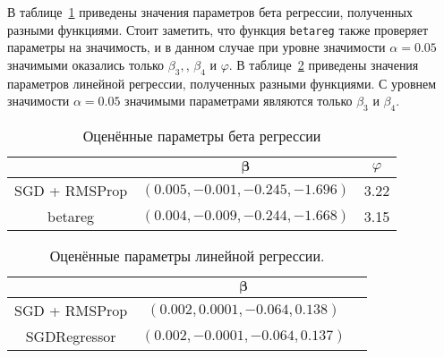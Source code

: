 \documentclass{article}
\begin{document}
В таблице~\ref{tab:beta-params} приведены значения параметров бета регрессии,
полученных разными функциями.
Стоит заметить, что функция \verb|betareg| также проверяет параметры на значимость,
и в данном случае при уровне значимости $\alpha = 0.05$ значимыми оказались только
$\beta_3,$, $\beta_4$ и $\varphi$.
В таблице~\ref{tab:lin-params} приведены значения параметров линейной регрессии,
полученных разными функциями.
С уровнем значимости $\alpha=0.05$ значимыми параметрами являются только
$\beta_3$ и $\beta_4$.
\begin{table}[!ht]
  \centering
  \begin{tabular}{|c|c|c|}
    \hline
    & $\boldsymbol{\beta}$ & $\varphi$ \\ \hline
    SGD + RMSProp & $(0.005, -0.001, -0.245, -1.696)$ & 3.22 \\ \hline
    betareg & $(0.004, -0.009, -0.244, -1.668)$ & 3.15 \\ \hline
  \end{tabular}
  \caption{Оценённые параметры бета регрессии}\label{tab:beta-params}
\end{table}
\begin{table}[!ht]
  \centering
  \begin{tabular}{|c|c|c|}
    \hline
    & $\boldsymbol{\beta}$ \\ \hline
    SGD + RMSProp & $(0.002, 0.0001, -0.064, 0.138)$ \\ \hline
    SGDRegressor & $(0.002, -0.0001, -0.064, 0.137)$ \\ \hline
  \end{tabular}
  \caption{Оценённые параметры линейной регрессии.}\label{tab:lin-params}
\end{table}
\end{document}
